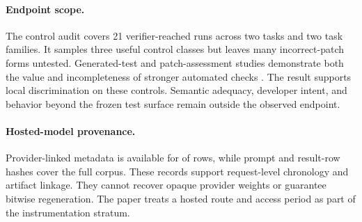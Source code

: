 \paragraph{Endpoint scope.}
The control audit covers 21 verifier-reached runs across two tasks and two task families. It samples three useful control classes but leaves many incorrect-patch forms untested. Generated-test and patch-assessment studies demonstrate both the value and incompleteness of stronger automated checks \citep{xin2017difftgen,ye2021patchassessment,liu2023evalplus}. The result supports local discrimination on these controls. Semantic adequacy, developer intent, and behavior beyond the frozen test surface remain outside the observed endpoint.

\paragraph{Hosted-model provenance.}
Provider-linked metadata is available for \ProviderMapped{} of \TotalRows{} rows, while prompt and result-row hashes cover the full corpus. These records support request-level chronology and artifact linkage. They cannot recover opaque provider weights or guarantee bitwise regeneration. The paper treats a hosted route and access period as part of the instrumentation stratum.
